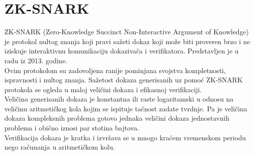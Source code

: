 \section{\textenglish{ZK-SNARK}} 
\textenglish{ZK-SNARK} (\textenglish{Zero-Knowledge Succinct Non-Interactive Argument of Knowledge}) je protokol nultog znanja koji pravi sa\v zeti dokaz koji  mo\v ze biti proveren brzo i  ne iziskuje interaktivnu komunikaciju dokazivača i verifikatora. Predstavljen je u radu\cite{zksnark184425} iz 2013. godine. \\
Ovim  protokolom su  zadovoljena ranije pominjana svojstva kompletnosti, ispravnosti i nultog znanja. Sažetost dokaza generisanih uz pomoć \textenglish{ZK-SNARK} protokola se ogleda u maloj veličini dokaza i efikasnoj verifikaciji. \\
Veličina generisanih dokaza je konstantna ili raste logaritamski u odnosu na veličinu aritmetičkog kola kojim se ispituje tačnost zadate tvrdnje. Pa je veličina dokaza kompleksnih problema gotovo jednaka veličini dokaza jednostavnih problema i obično iznosi par stotina bajtova. \\
Verifikacija  dokaza je kratka i izvršava se u mnogo kraćem vremenskom periodu nego računanja u aritmetičkom kolu\cite{snark}. 
\\

